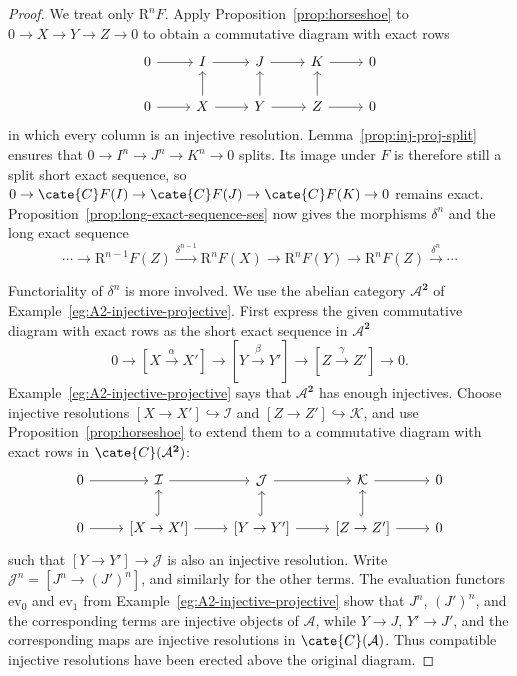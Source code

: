 \begin{proof}
	We treat only $\mathrm{R}^nF$. Apply Proposition~\ref{prop:horseshoe} to
	$0\to X\to Y\to Z\to0$ to obtain a commutative diagram with exact rows
	\[\begin{tikzcd}
		0 \arrow[r] & I \arrow[r] & J \arrow[r] & K \arrow[r] & 0 \\
		0 \arrow[r] & X \arrow[r] \arrow[u] & Y \arrow[r] \arrow[u] & Z \arrow[r] \arrow[u] & 0
	\end{tikzcd}\]
	in which every column is an injective resolution.
	Lemma~\ref{prop:inj-proj-split} ensures that
	$0\to I^n\to J^n\to K^n\to0$ splits. Its image under $F$ is therefore
	still a split short exact sequence, so
	$0\to\cate{C}F(I)\to\cate{C}F(J)\to\cate{C}F(K)\to0$ remains exact.
	Proposition~\ref{prop:long-exact-sequence-ses} now gives the morphisms
	$\delta^n$ and the long exact sequence
	\[ \cdots \to \mathrm{R}^{n-1} F(Z) \xrightarrow{\delta^{n-1}} \mathrm{R}^n F(X) \to \mathrm{R}^n F(Y) \to \mathrm{R}^n F(Z) \xrightarrow{\delta^n} \cdots \]

	Functoriality of $\delta^n$ is more involved. We use the abelian category
	$\mathcal{A}^{\mathbf{2}}$ of Example~\ref{eg:A2-injective-projective}.
	First express the given commutative diagram with exact rows as the short
	exact sequence in $\mathcal{A}^{\mathbf{2}}$
	\[ 0 \to [X \xrightarrow{\alpha} X'] \to [Y \xrightarrow{\beta} Y'] \to [Z \xrightarrow{\gamma} Z'] \to 0. \]
	Example~\ref{eg:A2-injective-projective} says that
	$\mathcal{A}^{\mathbf{2}}$ has enough injectives. Choose injective
	resolutions $[X\to X']\hookrightarrow\mathcal{I}$ and
	$[Z\to Z']\hookrightarrow\mathcal{K}$, and use
	Proposition~\ref{prop:horseshoe} to extend them to a commutative diagram
	with exact rows in $\cate{C}(\mathcal{A}^{\mathbf{2}})$:
	\begin{equation}\label{eqn:long-exact-sequence-primer-aux}\begin{tikzcd}
		0 \arrow[r] & \mathcal{I} \arrow[r] & \mathcal{J} \arrow[r] & \mathcal{K} \arrow[r] & 0 \\
		0 \arrow[r] & {[X \to X']} \arrow[r] \arrow[hookrightarrow, u] & {[Y \to Y']} \arrow[r] \arrow[hookrightarrow, u] & {[Z \to Z']} \arrow[r] \arrow[hookrightarrow, u] & 0
	\end{tikzcd}\end{equation}
	such that $[Y\to Y']\to\mathcal{J}$ is also an injective resolution.
	Write $\mathcal{J}^n=[J^n\to(J')^n]$, and similarly for the other terms.
	The evaluation functors $\mathrm{ev}_0$ and $\mathrm{ev}_1$ from
	Example~\ref{eg:A2-injective-projective} show that $J^n$, $(J')^n$, and
	the corresponding terms are injective objects of $\mathcal{A}$, while
	$Y\to J$, $Y'\to J'$, and the corresponding maps are injective
	resolutions in $\cate{C}(\mathcal{A})$. Thus compatible injective
	resolutions have been erected above the original diagram.


\end{proof}
